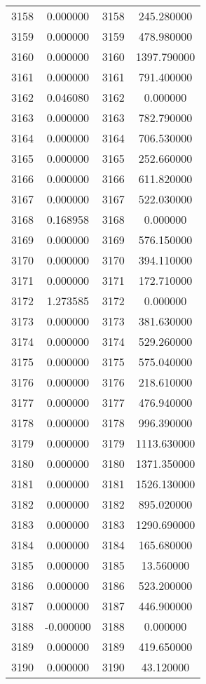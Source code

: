 \documentclass[12pt]{article}
\begin{document}
\begin{longtable}{@{}cccc@{}}
3158 & 0.000000 & 3158 & 245.280000 \\
3159 & 0.000000 & 3159 & 478.980000 \\
3160 & 0.000000 & 3160 & 1397.790000 \\
3161 & 0.000000 & 3161 & 791.400000 \\
3162 & 0.046080 & 3162 & 0.000000 \\
3163 & 0.000000 & 3163 & 782.790000 \\
3164 & 0.000000 & 3164 & 706.530000 \\
3165 & 0.000000 & 3165 & 252.660000 \\
3166 & 0.000000 & 3166 & 611.820000 \\
3167 & 0.000000 & 3167 & 522.030000 \\
3168 & 0.168958 & 3168 & 0.000000 \\
3169 & 0.000000 & 3169 & 576.150000 \\
3170 & 0.000000 & 3170 & 394.110000 \\
3171 & 0.000000 & 3171 & 172.710000 \\
3172 & 1.273585 & 3172 & 0.000000 \\
3173 & 0.000000 & 3173 & 381.630000 \\
3174 & 0.000000 & 3174 & 529.260000 \\
3175 & 0.000000 & 3175 & 575.040000 \\
3176 & 0.000000 & 3176 & 218.610000 \\
3177 & 0.000000 & 3177 & 476.940000 \\
3178 & 0.000000 & 3178 & 996.390000 \\
3179 & 0.000000 & 3179 & 1113.630000 \\
3180 & 0.000000 & 3180 & 1371.350000 \\
3181 & 0.000000 & 3181 & 1526.130000 \\
3182 & 0.000000 & 3182 & 895.020000 \\
3183 & 0.000000 & 3183 & 1290.690000 \\
3184 & 0.000000 & 3184 & 165.680000 \\
3185 & 0.000000 & 3185 & 13.560000 \\
3186 & 0.000000 & 3186 & 523.200000 \\
3187 & 0.000000 & 3187 & 446.900000 \\
3188 & -0.000000 & 3188 & 0.000000 \\
3189 & 0.000000 & 3189 & 419.650000 \\
3190 & 0.000000 & 3190 & 43.120000 \\

\end{longtable}
\end{document}

